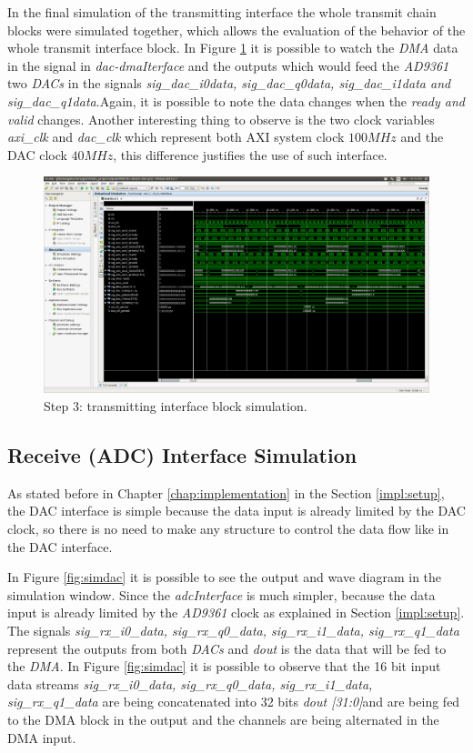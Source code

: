 In the final simulation of the transmitting interface the whole transmit chain
blocks were simulated together, which allows the evaluation of the behavior of
the whole transmit interface block. In Figure \ref{fig:simtxif} it is possible
to watch the \textit{DMA} data in the signal in \textit{dac-dmaIterface} and the
outputs which would feed the \textit{AD9361} two \textit{DACs} in the signals
\textit{sig\_dac\_i0data, sig\_dac\_q0data, sig\_dac\_i1data and
sig\_dac\_q1data}.Again, it is possible to note the data changes when the
\textit{ready and valid} changes. Another interesting thing to observe is the
two clock variables \textit{axi\_clk} and \textit{dac\_clk} which represent both
AXI system clock $ 100 MHz$ and the DAC clock $40 MHz$, this difference
justifies the use of such interface.


\begin{figure}[htbp]
    \centering
    \includegraphics[width=1\textwidth,
    trim={{.67\textwidth} {.7\textwidth} {.05\textwidth} {.3\textwidth}},
    clip]{./figures/txInterface}
    \caption{ Step 3: transmitting interface block simulation.
    \label{fig:simtxif}}
\end{figure}

\subsection{Receive (ADC) Interface Simulation}

As stated before in Chapter \ref{chap:implementation} in the Section
\ref{impl:setup}, the DAC interface is simple because the data input is already
limited by the DAC clock, so there is no need to make any structure to control
the data flow like in the DAC interface.

In Figure \ref{fig:simdac} it is possible to see the output and wave diagram in
the simulation window. Since the \textit{adcInterface} is much simpler, because
the data input is already limited by the \textit{AD9361} clock as explained in
Section \ref{impl:setup}. The signals \textit{sig\_rx\_i0\_data,
sig\_rx\_q0\_data, sig\_rx\_i1\_data, sig\_rx\_q1\_data} represent the outputs
from both \textit{DACs} and \textit{dout} is the data that will be fed to the
\textit{DMA}. In Figure \ref{fig:simdac} it is possible to observe that the 16
bit input data streams \textit{sig\_rx\_i0\_data, sig\_rx\_q0\_data,
sig\_rx\_i1\_data, sig\_rx\_q1\_data} are being concatenated into 32 bits
\textit{dout [31:0]}and are being fed to the DMA block in the output and the
channels are being alternated in the DMA input.

